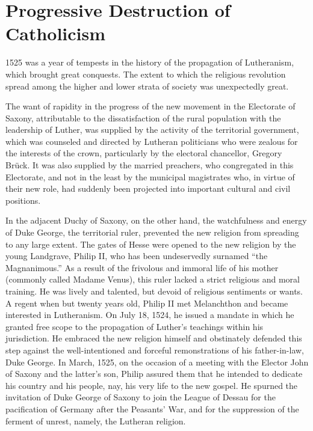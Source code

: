 \section{Progressive Destruction of Catholicism}

1525 was a year of tempests in the history of the propagation of
Lutheranism, which brought great conquests. The extent to which the
religious revolution spread among the higher and lower strata of
society was unexpectedly great.

The want of rapidity in the progress of the new movement in the
Electorate of Saxony, attributable to the dissatisfaction of the rural
population with the leadership of Luther, was supplied by the activity
of the territorial government, which was counseled and directed
by Lutheran politicians who were zealous for the interests of the
crown, particularly by the electoral chancellor, Gregory Brück. It
was also supplied by the married preachers, who congregated in this
Electorate, and not in the least by the municipal magistrates who,
in virtue of their new role, had suddenly been projected into important
cultural and civil positions.

In the adjacent Duchy of Saxony, on the other hand, the watchfulness and
energy of Duke George, the territorial ruler, prevented the
new religion from spreading to any large extent.
The gates of Hesse were opened to the new religion by the young
Landgrave, Philip II, who has been undeservedly surnamed ``the
Magnanimous.'' As a result of the frivolous and immoral life of
his mother (commonly called Madame Venus), this ruler lacked
a strict religious and moral training. He was lively and talented,
but devoid of religious sentiments or wants. A regent when but
twenty years old, Philip II met Melanchthon and became interested
in Lutheranism. On July 18, 1524, he issued a mandate in which he
granted free scope to the propagation of Luther’s teachings within his
jurisdiction. He embraced the new religion himself and obstinately
defended this step against the well-intentioned and forceful remonstrations
of his father-in-law, Duke George. In March, 1525, on the
occasion of a meeting with the Elector John of Saxony and the latter’s
son, Philip assured them that he intended to dedicate his country and
his people, nay, his very life to the new gospel. He spurned the invitation
of Duke George of Saxony to join the League of Dessau for the
pacification of Germany after the Peasants’ War, and for the suppression
of the ferment of unrest, namely, the Lutheran religion.

